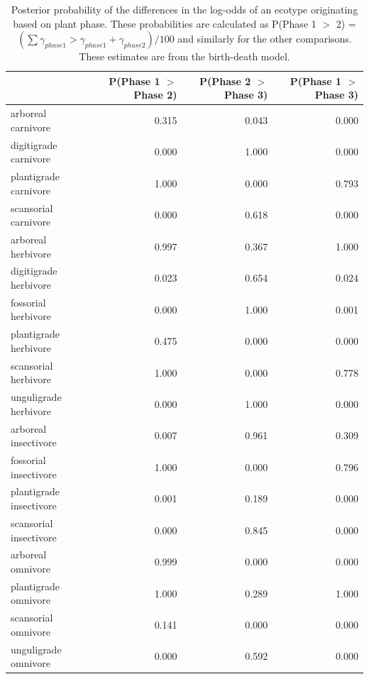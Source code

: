\documentclass[12pt,letterpaper]{article}
\begin{document}
\begin{table}[ht]
  \centering
  \caption[Posterior probablity estimates of differences in origination by plant phase]{Posterior probability of the differences in the log-odds of an ecotype originating based on plant phase. These probabilities are calculated as P(Phase 1 \(>\) 2) = \( (\sum \gamma_{phase 1} > \gamma_{phase 1} + \gamma_{phase 2}) / 100\) and similarly for the other comparisons. These estimates are from the birth-death model.}
  \label{tab:origin_plant}
  \begin{tabular}{ l r r r }
    \hline
    & P(Phase 1 $>$ Phase 2) & P(Phase 2 $>$ Phase 3) & P(Phase 1 $>$ Phase 3) \\ 
    \hline
    arboreal carnivore & 0.315 & 0.043 & 0.000 \\ 
    digitigrade carnivore & 0.000 & 1.000 & 0.000 \\ 
    plantigrade carnivore & 1.000 & 0.000 & 0.793 \\ 
    scansorial carnivore & 0.000 & 0.618 & 0.000 \\ 
    arboreal herbivore & 0.997 & 0.367 & 1.000 \\ 
    digitigrade herbivore & 0.023 & 0.654 & 0.024 \\ 
    fossorial herbivore & 0.000 & 1.000 & 0.001 \\ 
    plantigrade herbivore & 0.475 & 0.000 & 0.000 \\ 
    scansorial herbivore & 1.000 & 0.000 & 0.778 \\ 
    unguligrade herbivore & 0.000 & 1.000 & 0.000 \\ 
    arboreal insectivore & 0.007 & 0.961 & 0.309 \\ 
    fossorial insectivore & 1.000 & 0.000 & 0.796 \\ 
    plantigrade insectivore & 0.001 & 0.189 & 0.000 \\ 
    scansorial insectivore & 0.000 & 0.845 & 0.000 \\ 
    arboreal omnivore & 0.999 & 0.000 & 0.000 \\ 
    plantigrade omnivore & 1.000 & 0.289 & 1.000 \\ 
    scansorial omnivore & 0.141 & 0.000 & 0.000 \\ 
    unguligrade omnivore & 0.000 & 0.592 & 0.000 \\ 
    \hline
  \end{tabular}
\end{table}
\end{document}
